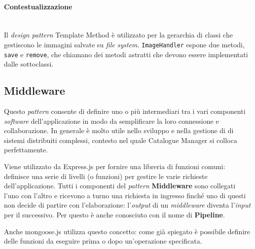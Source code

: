 \paragraph{Contestualizzazione} \mbox{} \\
Il \textit{design pattern} Template Method è utilizzato per la gerarchia di classi che gestiscono le immagini salvate su \textit{file system}. \texttt{ImageHandler} espone due metodi, \texttt{save} e \texttt{remove}, che chiamano dei metodi astratti che devono essere implementati dalle sottoclassi. 

\subsection{Middleware}
Questo \textit{pattern} consente di definire uno o più intermediari tra i vari componenti \textit{software} dell'applicazione in modo da semplificare la loro connessione e collaborazione. In generale è molto utile nello sviluppo e nella gestione di di sistemi distribuiti complessi, contesto nel quale Catalogue Manager si colloca perfettamente. 

Viene utilizzato da Express.js per fornire una libreria di funzioni comuni: definisce una serie di livelli (o funzioni) per gestire le varie richieste dell'applicazione. Tutti i componenti del \textit{pattern} \textbf{Middleware} sono collegati l'uno con l'altro e ricevono a turno una richiesta in ingresso finché uno di questi non decide di partire con l'elaborazione: l'\textit{output} di un \textit{middleware} diventa l'\textit{input} per il successivo. Per questo è anche conosciuto con il nome di \textbf{Pipeline}.

Anche mongoose.js utilizza questo concetto: come già spiegato è possibile definire delle funzioni da eseguire prima o dopo un'operazione specificata. 

%

